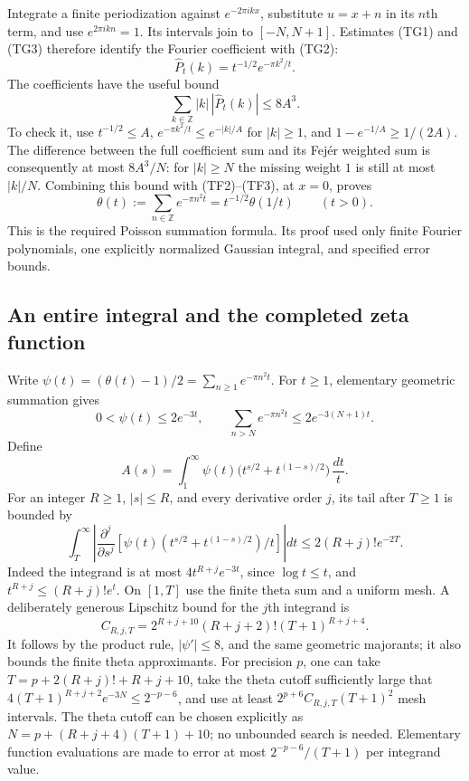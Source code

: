 Integrate a finite periodization against $e^{-2\pi ikx}$, substitute
$u=x+n$ in its $n$th term, and use $e^{2\pi ikn}=1$.  Its intervals
join to $[-N,N+1]$.  Estimates (TG1) and (TG3) therefore identify the
Fourier coefficient with (TG2):
\[
 \widehat P_t(k)=t^{-1/2}e^{-\pi k^2/t}.
\]
The coefficients have the useful bound
\[
 \sum_{k\in\mathbb Z}|k|\,|\widehat P_t(k)|\le8A^3. \tag{TG5}
\]
To check it, use $t^{-1/2}\le A$,
$e^{-\pi k^2/t}\le e^{-|k|/A}$ for $|k|\ge1$, and
$1-e^{-1/A}\ge1/(2A)$.  The difference between the full coefficient
sum and its Fej\'er weighted sum is consequently at most $8A^3/N$:
for $|k|\ge N$ the missing weight $1$ is still at most $|k|/N$.
Combining this bound with (TF2)--(TF3), at $x=0$, proves
\begin{equation}
 \boxed{\displaystyle
 \theta(t):=\sum_{n\in\mathbb Z}e^{-\pi n^2t}
       =t^{-1/2}\theta(1/t)\qquad(t>0).}
 \label{eq:theta-transformation}
\end{equation}
This is the required Poisson summation formula.  Its proof used only
finite Fourier polynomials, one explicitly normalized Gaussian
integral, and specified error bounds.

\subsection{An entire integral and the completed zeta function}

Write $\psi(t)=(\theta(t)-1)/2=\sum_{n\ge1}e^{-\pi n^2t}$.
For $t\ge1$, elementary geometric summation gives
\[
 0<\psi(t)\le2e^{-3t},\qquad
 \sum_{n>N}e^{-\pi n^2t}\le2e^{-3(N+1)t}.            \tag{TH1}
\]
Define
\begin{equation}
 A(s)=\int_1^\infty\psi(t)
             \bigl(t^{s/2}+t^{(1-s)/2}\bigr)\,\frac{dt}{t}.
 \label{eq:theta-entire-integral}
\end{equation}
For an integer $R\ge1$, $|s|\le R$, and every derivative order $j$,
its tail after $T\ge1$ is bounded by
\[
 \int_T^\infty\left|
 \frac{\partial^j}{\partial s^j}
 \left[\psi(t)(t^{s/2}+t^{(1-s)/2})/t\right]\right|dt
       \le2(R+j)!e^{-2T}.                           \tag{TH2}
\]
Indeed the integrand is at most
$4t^{R+j}e^{-3t}$, since $\log t\le t$, and
$t^{R+j}\le(R+j)!e^t$.  On $[1,T]$ use the finite theta sum and a
uniform mesh.  A deliberately generous Lipschitz bound for the
$j$th integrand is
\[
 C_{R,j,T}=2^{R+j+10}(R+j+2)!(T+1)^{R+j+4}.          \tag{TH3}
\]
It follows by the product rule, $|\psi'|\le8$, and the same geometric
majorants; it also bounds the finite theta approximants.
For precision $p$, one can take
$T=p+2(R+j)!+R+j+10$, take the theta cutoff sufficiently large that
$4(T+1)^{R+j+2}e^{-3N}\le2^{-p-6}$, and use at least
$2^{p+6}C_{R,j,T}(T+1)^2$ mesh intervals.  The theta cutoff can be
chosen explicitly as
$N=p+(R+j+4)(T+1)+10$; no unbounded search is needed.  Elementary
function evaluations are made to error at most
$2^{-p-6}/(T+1)$ per integrand value.

